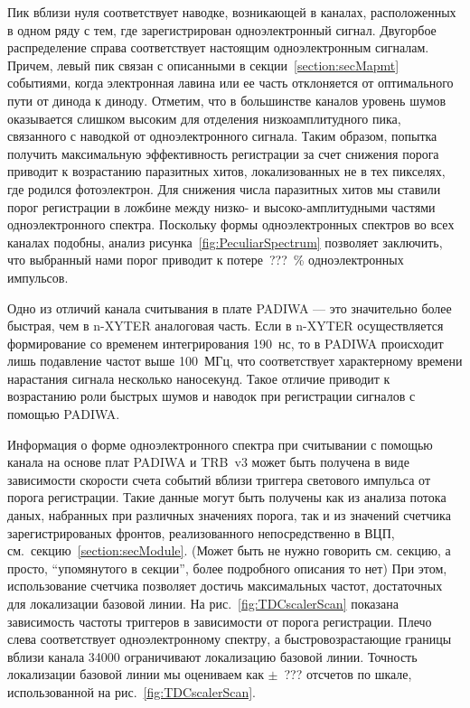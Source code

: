 Пик вблизи нуля соответствует наводке, возникающей в каналах, расположенных в одном ряду с тем, где зарегистрирован одноэлектронный сигнал. Двугорбое распределение справа соответствует настоящим одноэлектронным сигналам. Причем, левый пик связан с описанными в секции~\ref{section:secMapmt} событиями, когда электронная лавина или ее часть отклоняется от оптимального пути от динода к диноду. Отметим, что в большинстве каналов уровень шумов оказывается слишком высоким для отделения низкоамплитудного пика, связанного с наводкой от одноэлектронного сигнала. Таким образом, попытка получить максимальную эффективность регистрации за счет снижения порога приводит к возрастанию паразитных хитов, локализованных не в тех пикселях, где родился фотоэлектрон. Для снижения числа паразитных хитов мы ставили порог регистрации в ложбине между низко- и высоко-амплитудными частями одноэлектронного спектра. Поскольку формы одноэлектронных спектров во всех каналах подобны, анализ рисунка~\ref{fig:PeculiarSpectrum} позволяет заключить, что выбранный нами порог приводит к потере~???~\% одноэлектронных импульсов.

Одно из отличий канала считывания в плате PADIWA --- это значительно более быстрая, чем в n-XYTER аналоговая часть. Если в n-XYTER осуществляется формирование со временем интегрирования 190~нс, то в PADIWA происходит лишь подавление частот выше 100~МГц, что соответствует характерному времени нарастания сигнала несколько наносекунд. Такое отличие приводит к возрастанию роли быстрых шумов и наводок при регистрации сигналов с помощью PADIWA.

Информация о форме одноэлектронного спектра при считывании с помощью канала на основе плат PADIWA и TRB~v3 может быть получена в виде зависимости скорости счета событий вблизи триггера светового импульса от порога регистрации. Такие данные могут быть получены как из анализа потока даных, набранных при различных значениях порога, так и из значений счетчика зарегистрированых фронтов, реализованного непосредственно в ВЦП, см.~секцию~\ref{section:secModule}. (Может быть не нужно говорить см. секцию, а просто, ``упомянутого в секции'', более подробного описания то нет) При этом, использование счетчика позволяет достичь максимальных частот, достаточных для локализации базовой линии. На рис.~\ref{fig:TDCscalerScan} показана зависимость частоты триггеров в зависимости от порога регистрации. Плечо слева соответствует одноэлектронному спектру, а быстровозрастающие границы вблизи канала 34000 ограничивают локализацию базовой линии. Точность локализации базовой линии мы оцениваем как $ \pm $~??? отсчетов по шкале, использованной на рис.~\ref{fig:TDCscalerScan}.

